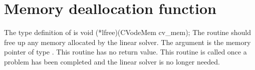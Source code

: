 
\section{Memory deallocation function}
The type definition of  is
{
  void (*lfree)(CVodeMem cv\_mem);
}
{
  The routine  should free up any memory allocated by the linear
  solver.
}
{
  The argument  is the {\cvode} memory pointer of type .
}
{
  This routine has no return value.
}
{
  This routine is called once a problem has been completed and the 
  linear solver is no longer needed.
}
